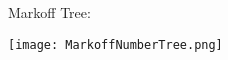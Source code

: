 \documentclass[12pt]{article}
\begin{document}
\newpage

Markoff Tree:

\texttt{[image: MarkoffNumberTree.png]}

\newpage



\selectfont \fontsize{12}{10}\selectfont

\begin{thebibliography}{}

\item 

\end{thebibliography}
\end{document}
